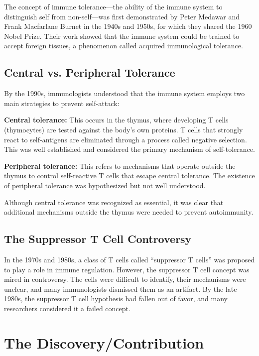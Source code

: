The concept of immune tolerance---the ability of the immune system to distinguish self from non-self---was first demonstrated by Peter Medawar and Frank Macfarlane Burnet in the 1940s and 1950s, for which they shared the 1960 Nobel Prize. Their work showed that the immune system could be trained to accept foreign tissues, a phenomenon called acquired immunological tolerance.

\subsection{Central vs. Peripheral Tolerance}

By the 1990s, immunologists understood that the immune system employs two main strategies to prevent self-attack:

\textbf{Central tolerance:} This occurs in the thymus, where developing T cells (thymocytes) are tested against the body's own proteins. T cells that strongly react to self-antigens are eliminated through a process called negative selection. This was well established and considered the primary mechanism of self-tolerance.

\textbf{Peripheral tolerance:} This refers to mechanisms that operate outside the thymus to control self-reactive T cells that escape central tolerance. The existence of peripheral tolerance was hypothesized but not well understood.

Although central tolerance was recognized as essential, it was clear that additional mechanisms outside the thymus were needed to prevent autoimmunity.

\subsection{The Suppressor T Cell Controversy}

In the 1970s and 1980s, a class of T cells called ``suppressor T cells'' was proposed to play a role in immune regulation. However, the suppressor T cell concept was mired in controversy. The cells were difficult to identify, their mechanisms were unclear, and many immunologists dismissed them as an artifact. By the late 1980s, the suppressor T cell hypothesis had fallen out of favor, and many researchers considered it a failed concept.

\section{The Discovery/Contribution}

